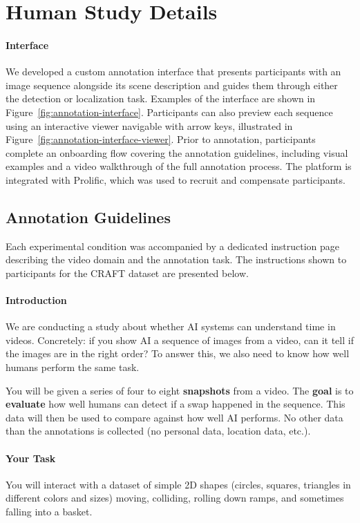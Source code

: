 \documentclass[11pt]{article}
\begin{document}
\section{Human Study Details}
\label{appendix:human_study}

\paragraph{Interface}
We developed a custom annotation interface that presents participants with an image sequence alongside its scene description and guides them through either the detection or localization task. Examples of the interface are shown in Figure~\ref{fig:annotation-interface}. Participants can also preview each sequence using an interactive viewer navigable with arrow keys, illustrated in Figure~\ref{fig:annotation-interface-viewer}. Prior to annotation, participants complete an onboarding flow covering the annotation guidelines, including visual examples and a video walkthrough of the full annotation process. The platform is integrated with Prolific, which was used to recruit and compensate participants.

\subsection{Annotation Guidelines}

Each experimental condition was accompanied by a dedicated instruction page describing the video domain and the annotation task. The instructions shown to participants for the CRAFT dataset are presented below.

\paragraph{Introduction}
We are conducting a study about whether AI systems can understand time in videos. Concretely: if you show AI a sequence of images from a video, can it tell if the images are in the right order? To answer this, we also need to know how well humans perform the same task.

You will be given a series of four to eight \textbf{snapshots} from a video. The \textbf{goal} is to \textbf{evaluate} how well humans can detect if a swap happened in the sequence. This data will then be used to compare against how well AI performs. No other data than the annotations is collected (no personal data, location data, etc.).

\paragraph{Your Task}
You will interact with a dataset of simple 2D shapes (circles, squares, triangles in different colors and sizes) moving, colliding, rolling down ramps, and sometimes falling into a basket.
\end{document}
